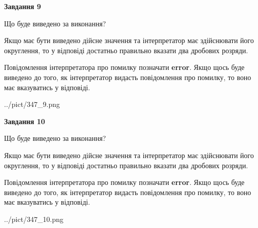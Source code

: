 \documentclass[12pt, ukrainian]{article}
\begin{document}
{\begin {Large}
{\begin {center}\textbf{Завдання 9}\end {center}}\par
Що буде виведено за виконання? \par

Якщо має бути виведено дійсне значення та інтерпретатор має здійснювати його округлення, 
то у відповіді достатньо правильно вказати два дробових розряди.

Повідомлення інтерпретатора про помилку позначати \textbf{error}.
Якщо щось буде виведено до того, як інтерпретатор видасть повідомлення про помилку, 
то воно має вказуватись у відповіді. \par

\begin{center}
	{../pict/347_9.png}
\end{center}
\newpage

{\begin {center}\textbf{Завдання 10}\end {center}}\par
Що буде виведено за виконання? \par

Якщо має бути виведено дійсне значення та інтерпретатор має здійснювати його округлення, 
то у відповіді достатньо правильно вказати два дробових розряди.

Повідомлення інтерпретатора про помилку позначати \textbf{error}.
Якщо щось буде виведено до того, як інтерпретатор видасть повідомлення про помилку, 
то воно має вказуватись у відповіді. \par

\begin{center}
	{../pict/347_10.png}
\end{center}
\newpage

\end {Large}}
\end{document}
